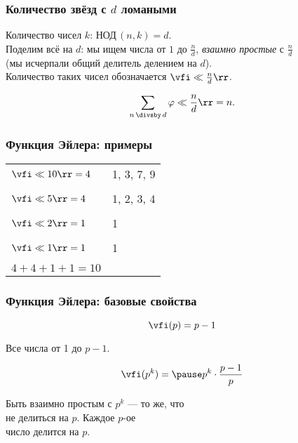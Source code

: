 \begin{frame} \frametitle{Количество звёзд с $d$ ломаными}
	Количество чисел $k$: $\text{НОД}\,(n,k) = d$.\\[0.6cm] \pause
	Поделим всё на $d$: мы ищем числа от $1$ до $\frac{n}{d}$, {\it взаимно простые} с $\frac{n}{d}$\\ (мы исчерпали общий делитель делением на $d$).\\[0.6cm]
	Количество таких чисел обозначается $\vfi\ll\frac{n}{d}\rr$.\\[0.6cm] \pause
     \begin{theorem} \vspace{-3.5mm}
	\[\sum\limits_{n\,\divsby\,d} \varphi \ll\frac{n}{d}\rr = n.\] \vspace{-2mm}
     \end{theorem}
\end{frame}

\begin{frame} \frametitle{Функция Эйлера: примеры}
   \begin{center} \begin{tabular}{ll}
	$\vfi\ll 10\rr = 4$ & 1, 3, 7, 9 \\ \\
	$\vfi\ll 5 \rr = 4$ & 1, 2, 3, 4 \\ \\
	$\vfi\ll 2 \rr = 1$ & 1 \\ \\
	$\vfi\ll 1 \rr = 1$ & 1 \\ \\
	$4+4+1+1 = 10$
   \end{tabular} \end{center}
\end{frame}

\begin{frame} \frametitle{Функция Эйлера: базовые свойства}
	\begin{theorem} \vspace{-4.5mm} \[ \vfi(p) = p-1 \] \vspace{-5mm} \end{theorem}
	\vspace{-2mm}

	Все числа от 1 до $p-1$.\bigskip\pause

	\begin{theorem} \vspace{-3.5mm} \[ \vfi(p^k) =\pause p^k \cdot \frac{p-1}{p} \] \vspace{-4mm} \end{theorem}
	\vspace{-2mm}

	Быть взаимно простым с $p^k$ — то же, что\\
	не делиться на $p$. Каждое $p$-ое\\
	число делится на $p$.
\end{frame}


